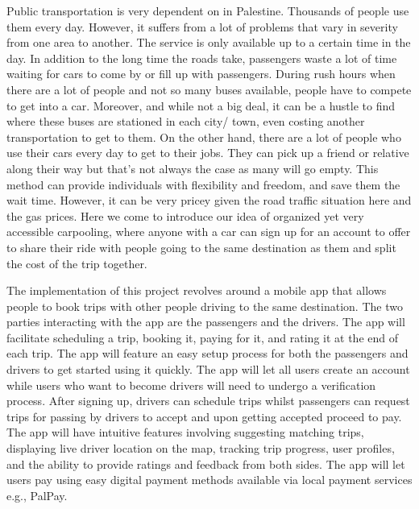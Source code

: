 \documentclass[a4paper, 12pt]{article} %
\begin{document}
            Public transportation is very dependent on in Palestine. Thousands of people use them every day. However, it suffers from a lot of problems that vary in severity from one area to another. The service is only available up to a certain time in the day. In addition to the long time the roads take, passengers waste a lot of time waiting for cars to come by or fill up with passengers. During rush hours when there are a lot of people and not so many buses available, people have to compete to get into a car. Moreover, and while not a big deal, it can be a hustle to find where these buses are stationed in each city/ town, even costing another transportation to get to them. On the other hand, there are a lot of people who use their cars every day to get to their jobs. They can pick up a friend or relative along their way but that's not always the case as many will go empty. This method can provide individuals with flexibility and freedom, and save them the wait time. However, it can be very pricey given the road traffic situation here and the gas prices. Here we come to introduce our idea of organized yet very accessible carpooling, where anyone with a car can sign up for an account to offer to share their ride with people going to the same destination as them and split the cost of the trip together. 

            The implementation of this project revolves around a mobile app that allows people to book trips with other people driving to the same destination. The two parties interacting with the app are the passengers and the drivers. The app will facilitate scheduling a trip, booking it, paying for it, and rating it at the end of each trip. The app will feature an easy setup process for both the passengers and drivers to get started using it quickly. The app will let all users create an account while users who want to become drivers will need to undergo a verification process. After signing up, drivers can schedule trips whilst passengers can request trips for passing by drivers to accept and upon getting accepted proceed to pay. The app will have intuitive features involving suggesting matching trips, displaying live driver location on the map, tracking trip progress, user profiles, and the ability to provide ratings and feedback from both sides. The app will let users pay using easy digital payment methods available via local payment services e.g., PalPay. 
        
\end{document}
